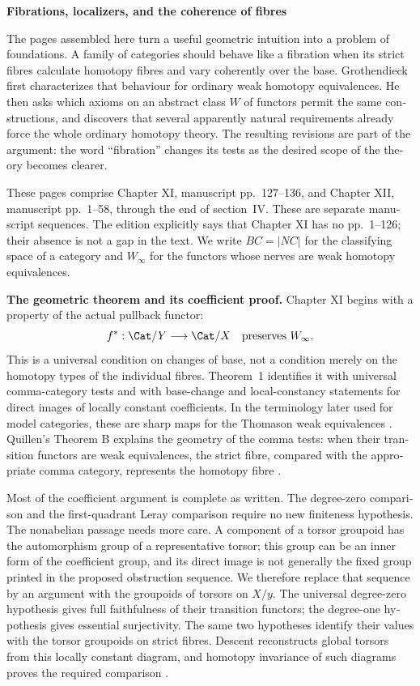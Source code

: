 \begin{otherlanguage}{english}
\noindent\textbf{Fibrations, localizers, and the coherence of fibres}

\medskip
The pages assembled here turn a useful geometric intuition into a problem of foundations. A family of categories should behave like a fibration when its strict fibres calculate homotopy fibres and vary coherently over the base. Grothendieck first characterizes that behaviour for ordinary weak homotopy equivalences. He then asks which axioms on an abstract class \(W\) of functors permit the same constructions, and discovers that several apparently natural requirements already force the whole ordinary homotopy theory. The resulting revisions are part of the argument: the word “fibration” changes its tests as the desired scope of the theory becomes clearer.

These pages comprise Chapter XI, manuscript pp.~127--136, and Chapter XII, manuscript pp.~1--58, through the end of section~IV. These are separate manuscript sequences. The edition explicitly says that Chapter XI has no pp.~1--126; their absence is not a gap in the text. We write \(BC=|NC|\) for the classifying space of a category and \(W_\infty\) for the functors whose nerves are weak homotopy equivalences.

\medskip
\noindent\textbf{The geometric theorem and its coefficient proof.}
Chapter XI begins with a property of the actual pullback functor:
\[
 f^*:\Cat/Y\longrightarrow\Cat/X
 \quad\hbox{preserves }W_\infty.
\]
This is a universal condition on changes of base, not a condition merely on the homotopy types of the individual fibres. Theorem~1 identifies it with universal comma-category tests and with base-change and local-constancy statements for direct images of locally constant coefficients. In the terminology later used for model categories, these are sharp maps for the Thomason weak equivalences \citep[\S2]{Rezk1998Sharp}. Quillen's Theorem B explains the geometry of the comma tests: when their transition functors are weak equivalences, the strict fibre, compared with the appropriate comma category, represents the homotopy fibre \citep[\S1]{Quillen1973}.

Most of the coefficient argument is complete as written. The degree-zero comparison and the first-quadrant Leray comparison require no new finiteness hypothesis. The nonabelian passage needs more care. A component of a torsor groupoid has the automorphism group of a representative torsor; this group can be an inner form of the coefficient group, and its direct image is not generally the fixed group printed in the proposed obstruction sequence. We therefore replace that sequence by an argument with the groupoids of torsors on \(X/y\). The universal degree-zero hypothesis gives full faithfulness of their transition functors; the degree-one hypothesis gives essential surjectivity. The same two hypotheses identify their values with the torsor groupoids on strict fibres. Descent reconstructs global torsors from this locally constant diagram, and homotopy invariance of such diagrams proves the required comparison \citep[Theorem~1.3]{Cisinski2009LocallyConstant}.


\end{otherlanguage}
